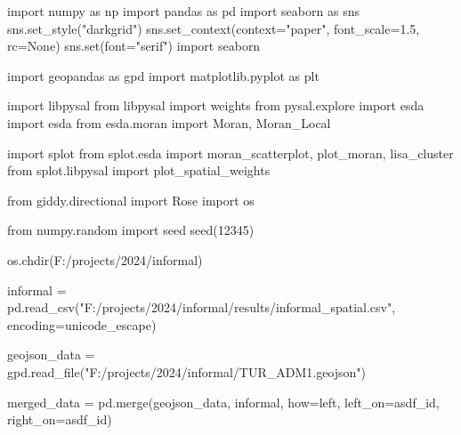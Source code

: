 \documentclass[
  letterpaper,
  DIV=11,
  numbers=noendperiod]{scrreprt}
\newenvironment{Shaded}{\begin{snugshade}}{\end{snugshade}}
\newcommand{\BuiltInTok}[1]{\textcolor[rgb]{0.00,0.23,0.31}{#1}}
\newcommand{\DecValTok}[1]{\textcolor[rgb]{0.68,0.00,0.00}{#1}}
\newcommand{\FloatTok}[1]{\textcolor[rgb]{0.68,0.00,0.00}{#1}}
\newcommand{\ImportTok}[1]{\textcolor[rgb]{0.00,0.46,0.62}{#1}}
\newcommand{\NormalTok}[1]{\textcolor[rgb]{0.00,0.23,0.31}{#1}}
\newcommand{\OperatorTok}[1]{\textcolor[rgb]{0.37,0.37,0.37}{#1}}
\newcommand{\StringTok}[1]{\textcolor[rgb]{0.13,0.47,0.30}{#1}}
\newcommand{\VariableTok}[1]{\textcolor[rgb]{0.07,0.07,0.07}{#1}}
\begin{document}
\begin{Shaded}
\begin{Highlighting}[]
\ImportTok{import}\NormalTok{ numpy }\ImportTok{as}\NormalTok{ np}
\ImportTok{import}\NormalTok{ pandas }\ImportTok{as}\NormalTok{ pd}
\ImportTok{import}\NormalTok{ seaborn }\ImportTok{as}\NormalTok{ sns}
\NormalTok{sns.set\_style(}\StringTok{"darkgrid"}\NormalTok{)}
\NormalTok{sns.set\_context(context}\OperatorTok{=}\StringTok{"paper"}\NormalTok{, font\_scale}\OperatorTok{=}\FloatTok{1.5}\NormalTok{, rc}\OperatorTok{=}\VariableTok{None}\NormalTok{)}
\NormalTok{sns.}\BuiltInTok{set}\NormalTok{(font}\OperatorTok{=}\StringTok{"serif"}\NormalTok{)}
\ImportTok{import}\NormalTok{ seaborn}

\ImportTok{import}\NormalTok{ geopandas }\ImportTok{as}\NormalTok{ gpd}
\ImportTok{import}\NormalTok{ matplotlib.pyplot }\ImportTok{as}\NormalTok{ plt}

\ImportTok{import}\NormalTok{ libpysal}
\ImportTok{from}\NormalTok{ libpysal  }\ImportTok{import}\NormalTok{ weights}
\ImportTok{from}\NormalTok{ pysal.explore }\ImportTok{import}\NormalTok{ esda }
\ImportTok{import}\NormalTok{ esda}
\ImportTok{from}\NormalTok{ esda.moran }\ImportTok{import}\NormalTok{ Moran, Moran\_Local}

\ImportTok{import}\NormalTok{ splot}
\ImportTok{from}\NormalTok{ splot.esda }\ImportTok{import}\NormalTok{ moran\_scatterplot, plot\_moran, lisa\_cluster}
\ImportTok{from}\NormalTok{ splot.libpysal }\ImportTok{import}\NormalTok{ plot\_spatial\_weights}

\ImportTok{from}\NormalTok{ giddy.directional }\ImportTok{import}\NormalTok{ Rose}
\ImportTok{import}\NormalTok{ os}

\ImportTok{from}\NormalTok{ numpy.random }\ImportTok{import}\NormalTok{ seed}
\NormalTok{seed(}\DecValTok{12345}\NormalTok{)}

\NormalTok{os.chdir(}\StringTok{\textquotesingle{}F:/projects/2024/informal\textquotesingle{}}\NormalTok{)}
\end{Highlighting}
\end{Shaded}

\begin{Shaded}
\begin{Highlighting}[]
\NormalTok{informal }\OperatorTok{=}\NormalTok{ pd.read\_csv(}\StringTok{"F:/projects/2024/informal/results/informal\_spatial.csv"}\NormalTok{, encoding}\OperatorTok{=}\StringTok{\textquotesingle{}unicode\_escape\textquotesingle{}}\NormalTok{)}

\NormalTok{geojson\_data }\OperatorTok{=}\NormalTok{ gpd.read\_file(}\StringTok{"F:/projects/2024/informal/TUR\_ADM1.geojson"}\NormalTok{)}

\NormalTok{merged\_data }\OperatorTok{=}\NormalTok{ pd.merge(geojson\_data, informal, how}\OperatorTok{=}\StringTok{\textquotesingle{}left\textquotesingle{}}\NormalTok{, left\_on}\OperatorTok{=}\StringTok{\textquotesingle{}asdf\_id\textquotesingle{}}\NormalTok{, right\_on}\OperatorTok{=}\StringTok{\textquotesingle{}asdf\_id\textquotesingle{}}\NormalTok{)}
\end{Highlighting}
\end{Shaded}
\end{document}
